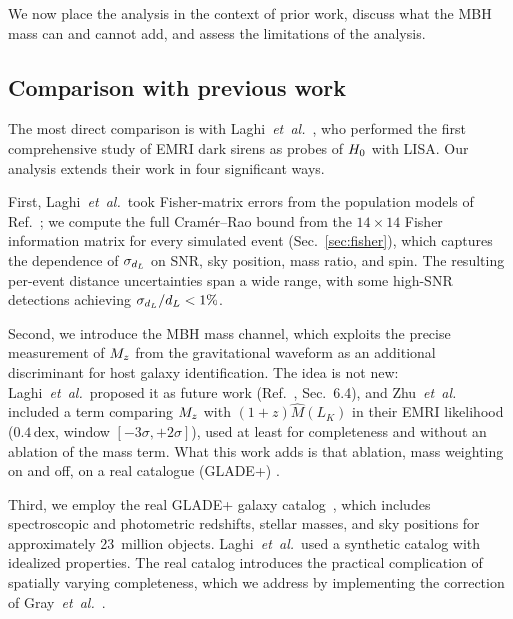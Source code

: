 
We now place the analysis in the context of prior work, discuss what
the MBH mass can and cannot add, and assess the limitations of the
analysis.

\subsection{Comparison with previous work}
\label{sec:comparison}

The most direct comparison is with
Laghi~\emph{et~al.}~\cite{Laghi:2021pqk}, who performed the first
comprehensive study of EMRI dark sirens as probes of $H_0$ with LISA.
Our analysis extends their work in four significant ways.

First, Laghi~\emph{et~al.}\ took Fisher-matrix errors from the
population models of Ref.~\cite{Babak:2017tow}; we compute the full
Cram\'{e}r--Rao bound from the $14 \times 14$ Fisher information matrix
for every simulated event (Sec.~\ref{sec:fisher}), which captures the
dependence of $\sigma_{d_L}$ on SNR, sky position, mass ratio, and spin.
The resulting per-event distance uncertainties span a wide range, with
some high-SNR detections achieving $\sigma_{d_L}/d_L < 1\%$.

Second, we introduce the MBH mass channel, which exploits the precise
measurement of $M_z$ from the gravitational waveform as an additional
discriminant for host galaxy identification.  The idea is not new:
Laghi~\emph{et~al.}\ proposed it as future work
(Ref.~\cite{Laghi:2021pqk}, Sec.~6.4), and
Zhu~\emph{et~al.}~\cite{Zhu:2024qpp} included a term comparing $M_z$
with $(1+z)\hat{M}(L_K)$ in their EMRI likelihood
($0.4\,\mathrm{dex}$, window $[-3\sigma, +2\sigma]$), used at least for
completeness and without an ablation of the mass term.  What this work
adds is that ablation, mass weighting on and off, on a real catalogue
(GLADE+) .

Third, we employ the real GLADE+ galaxy catalog~\cite{Dalya:2021ewn},
which includes spectroscopic and photometric redshifts, stellar masses,
and sky positions for approximately 23~million objects.
Laghi~\emph{et~al.}\ used a synthetic catalog with idealized properties.
The real catalog introduces the practical complication of spatially
varying completeness, which we address by implementing the correction of
Gray~\emph{et~al.}~\cite{Gray:2019ksv}.

